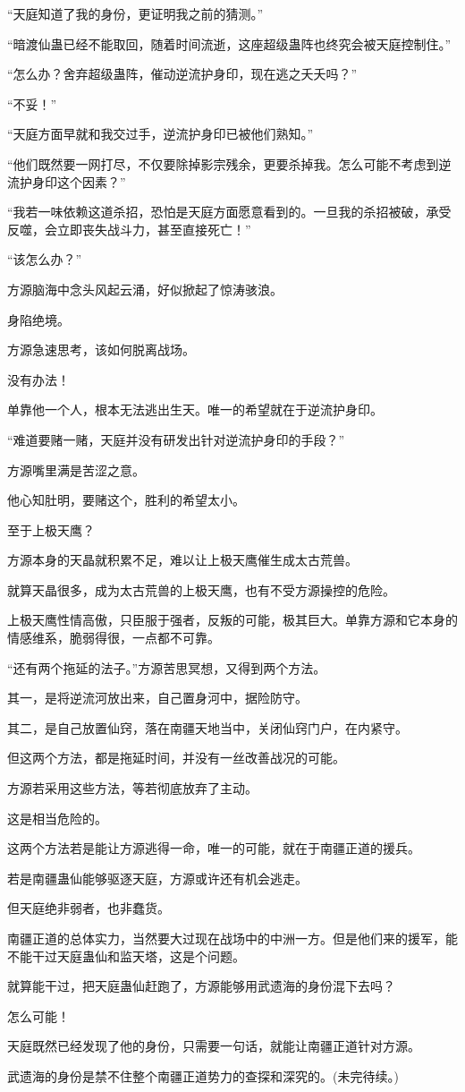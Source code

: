 \begin{this_body}
“天庭知道了我的身份，更证明我之前的猜测。”

“暗渡仙蛊已经不能取回，随着时间流逝，这座超级蛊阵也终究会被天庭控制住。”

“怎么办？舍弃超级蛊阵，催动逆流护身印，现在逃之夭夭吗？”

“不妥！”

“天庭方面早就和我交过手，逆流护身印已被他们熟知。”

“他们既然要一网打尽，不仅要除掉影宗残余，更要杀掉我。怎么可能不考虑到逆流护身印这个因素？”

“我若一味依赖这道杀招，恐怕是天庭方面愿意看到的。一旦我的杀招被破，承受反噬，会立即丧失战斗力，甚至直接死亡！”

“该怎么办？”

方源脑海中念头风起云涌，好似掀起了惊涛骇浪。

身陷绝境。

方源急速思考，该如何脱离战场。

没有办法！

单靠他一个人，根本无法逃出生天。唯一的希望就在于逆流护身印。

“难道要赌一赌，天庭并没有研发出针对逆流护身印的手段？”

方源嘴里满是苦涩之意。

他心知肚明，要赌这个，胜利的希望太小。

至于上极天鹰？

方源本身的天晶就积累不足，难以让上极天鹰催生成太古荒兽。

就算天晶很多，成为太古荒兽的上极天鹰，也有不受方源操控的危险。

上极天鹰性情高傲，只臣服于强者，反叛的可能，极其巨大。单靠方源和它本身的情感维系，脆弱得很，一点都不可靠。

“还有两个拖延的法子。”方源苦思冥想，又得到两个方法。

其一，是将逆流河放出来，自己置身河中，据险防守。

其二，是自己放置仙窍，落在南疆天地当中，关闭仙窍门户，在内紧守。

但这两个方法，都是拖延时间，并没有一丝改善战况的可能。

方源若采用这些方法，等若彻底放弃了主动。

这是相当危险的。

这两个方法若是能让方源逃得一命，唯一的可能，就在于南疆正道的援兵。

若是南疆蛊仙能够驱逐天庭，方源或许还有机会逃走。

但天庭绝非弱者，也非蠢货。

南疆正道的总体实力，当然要大过现在战场中的中洲一方。但是他们来的援军，能不能干过天庭蛊仙和监天塔，这是个问题。

就算能干过，把天庭蛊仙赶跑了，方源能够用武遗海的身份混下去吗？

怎么可能！

天庭既然已经发现了他的身份，只需要一句话，就能让南疆正道针对方源。

武遗海的身份是禁不住整个南疆正道势力的查探和深究的。(未完待续。)

\end{this_body}

